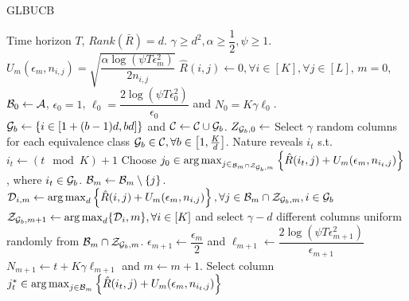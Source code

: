 \begin{algorithm}[!th]
\caption{GLBUCB}
\label{alg:NGLB}
\begin{algorithmic}[1]
 Time horizon $T$, $Rank(\bar{R}) = d$.
 $\gamma \geq d^2, \alpha \geq  \dfrac{1}{2}, \psi \geq 1$.
 $U_m(\epsilon_m, n_{i,j}) = \sqrt{\dfrac{\alpha\log(\psi T\epsilon_m^2)}{2n_{i,j}} }$
 $\hat{R}(i,j) \leftarrow 0, \forall i\in [K], \forall j\in [L]$, $m=0$, $\mathcal{B}_0 \leftarrow \mathcal{A}$, $\epsilon_0=1$, $\ell_0 =  \dfrac{2\log(\psi T\epsilon_{0}^2)}{\epsilon_{0}} $ and $N_0 =  K\gamma \ell_0 $.
 
\State  $\mathcal{G}_{b}\leftarrow \left\lbrace i\in \left[1+(b-1)d, bd\right]\right\rbrace$ and $\mathcal{C}\leftarrow \mathcal{C}\cup \mathcal{G}_{b}$.
\EndFor
\State $Z_{\mathcal{G}_b, 0}\leftarrow$ Select $\gamma$ random columns for each equivalence class $\mathcal{G}_b\in\mathcal{C}, \forall b\in \left[1,\frac{K}{d}\right] $. %
\State Nature reveals $i_t$ s.t. $i_t \leftarrow (t \mod K) + 1$ 
  
\State Choose $j_0 \in \mathop{\rm arg\,max}_{j\in_{\mathcal{B}_m\cap \mathcal{Z}_{\mathcal{G}_b,m}}}\left\lbrace \hat{R}(i_t,j)  + U_m(\epsilon_m, n_{i_t,j})\right\rbrace $, where $i_t\in \mathcal{G}_b$.
\Else {}
\ColElim
\State {}
\State {}
\State $\mathcal{B}_m \leftarrow \mathcal{B}_m \setminus \lbrace j \rbrace$. 
\EndWhile
\EndFor
\EndColElim
\ResParam
{}
\State $\mathcal{D}_{i,m} \leftarrow \mathop{\rm arg\,max}_d\left\lbrace \hat{R}(i,j)  + U_m(\epsilon_m, n_{i,j})\right\rbrace, \forall j\in \mathcal{B}_m\cap\mathcal{Z}_{\mathcal{G}_b,m}, i\in\mathcal{G}_b$
\EndFor
{} 
\State $\mathcal{Z}_{\mathcal{G}_b,m+1}\leftarrow \mathop{\rm arg\,max}_d\lbrace \mathcal{D}_i,m\rbrace, \forall i\in [K]$ and select $\gamma - d$ different columns uniform randomly from $\mathcal{B}_m\cap\mathcal{Z}_{\mathcal{G}_b,m}$.
\EndFor
\State $\epsilon_{m+1} \leftarrow \dfrac{\epsilon_m}{2}$ and $\ell_{m+1} \leftarrow \dfrac{2\log(\psi T\epsilon_{m+1}^2)}{\epsilon_{m+1}}$
\State $N_{m+1}\leftarrow t + K \gamma \ell_{m+1} $ and $m \leftarrow m + 1$.
\EndResParam
\EndIf
\Else {}
\State  Select column $j_t^*\in \mathop{\rm arg\,max}_{j\in\mathcal{B}_m} \left\lbrace \hat{R}(i_t,j) + U_m(\epsilon_m, n_{i_t,j})\right\rbrace$ 
\EndIf
\EndFor
\end{algorithmic}
\end{algorithm}


